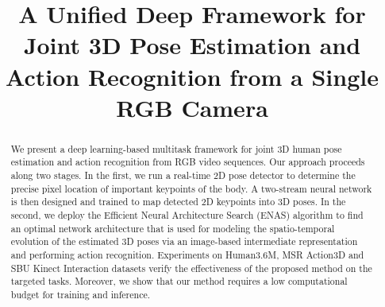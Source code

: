 \documentclass{bmvc2k}
\title{A Unified Deep Framework for Joint 3D Pose Estimation and Action Recognition from a Single RGB Camera}
\begin{document}
\maketitle

\begin{abstract}
We present a deep learning-based multitask framework for joint 3D human pose estimation and action recognition from RGB video sequences. Our approach proceeds along two stages. In the first, we run a real-time 2D pose detector to determine the precise pixel location of important keypoints of the body. A two-stream neural network is then designed and trained to map detected 2D keypoints into 3D poses. In the second, we deploy the Efficient Neural Architecture Search (ENAS) algorithm to find an optimal network architecture that is used for modeling the spatio-temporal evolution of the estimated 3D poses via an image-based intermediate representation and performing action recognition. Experiments on Human3.6M, MSR Action3D and SBU Kinect Interaction datasets verify the effectiveness of the proposed method on the targeted tasks. Moreover, we show that our method requires a low computational budget for training and inference.
\end{abstract} 
\end{document}
